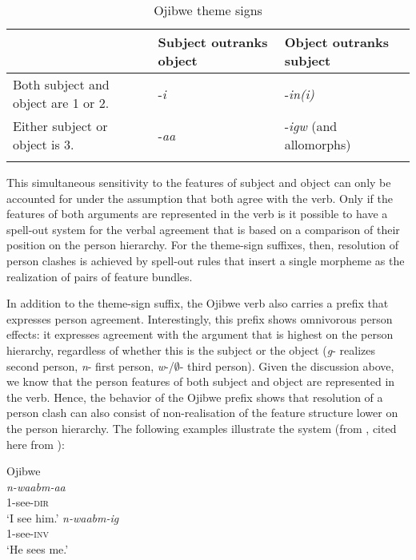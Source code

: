 \documentclass[output=paper]{langsci/langscibook}
\begin{document}
\begin{table} 
\caption{Ojibwe theme signs\label{tab:01:4}}
\begin{tabularx}{\textwidth}{Qll} 
\lsptoprule
& Subject outranks object & Object outranks subject \\\midrule
Both subject and object are 1 or 2. & -\textit{i} & -\textit{in(i)}\\
Either subject or object is 3. & -\textit{aa} & -\textit{igw} (and allomorphs)\\
\lspbottomrule
\end{tabularx}
\end{table}
 
This simultaneous sensitivity to the features of subject and object can only be accounted for under the assumption that both agree with the verb. Only if the features of both arguments are represented in the verb is it possible to have a spell-out system for the verbal agreement that is based on a comparison of their position on the person hierarchy. For the theme-sign suffixes, then, resolution of person clashes is achieved by spell-out rules that insert a single morpheme as the realization of pairs of feature bundles.

  In addition to the theme-sign suffix, the Ojibwe verb also carries a prefix that expresses person agreement. Interestingly, this prefix shows omnivorous person effects: it expresses agreement with the argument that is highest on the person hierarchy, regardless of whether this is the subject or the object (\textit{g}{}- realizes second person, \textit{n}{}- first person, \textit{w}{}-/${\emptyset}${}- third person). Given the discussion above, we know that the person features of both subject and object are represented in the verb. Hence, the behavior of the Ojibwe prefix shows that resolution of a person clash can also consist of non-realisation of the feature structure lower on the person hierarchy. The following examples illustrate the system (from \citealt{Valentine2001}, cited here from \citealt{Lochbihler2008}):

\ea      Ojibwe\\
 \ea
 \gll  \textit{n-waabm-aa} \\
       \textsc{1}-see-\textsc{dir}    \\
 \glt  ‘I see him.’
\ex
  \gll     \textit{n-waabm-ig}\\
           \textsc{1}-see-\textsc{inv}  \\
  \glt         ‘He sees me.’
\z
 \z
\end{document}
